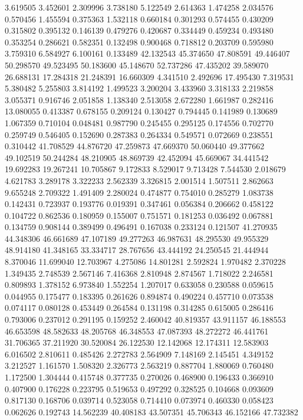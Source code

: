 3.619505
3.452601
2.309996
3.738180
5.122549
2.614363
1.474258
2.034576
0.570456
1.455594
0.375363
1.532118
0.660184
0.301293
0.574455
0.430209
0.315802
0.395132
0.146139
0.479276
0.420687
0.334449
0.459234
0.493480
0.353254
0.286621
0.582351
0.132498
0.900468
0.718812
0.203709
0.595980
3.759310
6.584927
6.100161
0.133489
42.132543
45.374650
47.808591
49.446407
50.298570
49.523495
50.183600
45.148670
52.737286
47.435202
39.589070
26.688131
17.284318
21.248391
16.660309
4.341510
2.492696
17.495430
7.319531
5.380482
5.255803
3.814192
1.499523
3.200204
3.433960
3.318133
2.219858
3.055371
0.916746
2.051858
1.138340
2.513058
2.672280
1.661987
0.282416
13.080055
0.413387
0.678155
0.209124
0.130427
0.794445
0.141989
0.130689
1.067359
0.710104
0.048481
0.987790
0.245455
0.295125
0.174556
0.702770
0.259749
0.546405
0.152690
0.287383
0.264334
0.549571
0.072669
0.238551
0.310442
41.708529
44.876720
47.259873
47.669370
50.060440
49.377662
49.102519
50.244284
48.210905
48.869739
42.452094
45.669067
34.441542
19.692283
19.267241
10.705867
9.172833
8.529017
9.713428
7.544530
2.018679
4.621783
3.289178
3.322233
2.562339
3.326815
2.001514
1.507511
2.862663
9.655248
2.709322
1.491409
2.280024
0.474877
0.754010
0.285279
1.083738
0.142431
0.723937
0.193776
0.019391
0.347461
0.056384
0.206662
0.458122
0.104722
0.862536
0.180959
0.155007
0.751571
0.181253
0.036492
0.067881
0.134759
0.908144
0.389499
0.496491
0.167038
0.233124
0.121507
41.270935
44.348306
46.661689
47.107189
49.277263
46.987631
48.295530
49.955329
48.914180
41.348165
33.334717
28.767656
43.444192
24.250545
21.444944
8.370046
11.699040
12.703967
4.275086
14.801281
2.592824
1.970482
2.370228
1.349435
2.748539
2.567146
7.416368
2.810948
2.874567
1.718022
2.246581
0.809893
1.378152
6.973840
1.552254
1.207017
0.633058
0.230588
0.059615
0.044955
0.175477
0.183395
0.261626
0.894874
0.490224
0.457710
0.073538
0.074117
0.080128
0.453449
0.264584
0.131198
0.314285
0.615005
0.286416
0.793006
0.237012
0.291195
0.159252
2.460042
40.819357
43.911157
46.188553
46.653598
48.582633
48.205768
46.348553
47.087393
48.272272
46.441761
31.706365
37.211920
30.520084
26.122530
12.142068
12.174311
12.583903
6.016502
2.810611
0.485426
2.272783
2.564909
7.148169
2.145451
4.349152
3.212527
1.161570
1.508320
2.326773
2.563219
0.887704
1.880069
0.760480
1.172500
1.304444
0.415748
0.377735
0.270026
0.468900
0.196433
0.366910
0.407900
0.176228
0.223795
0.519653
0.497292
0.328525
0.104668
0.093609
0.817130
0.168706
0.039714
0.523058
0.714410
0.073974
0.460330
0.058423
0.062626
0.192743
14.562239
40.408183
43.507351
45.706343
46.152166
47.732382
